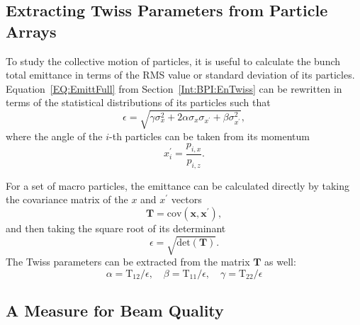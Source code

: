 \subsection{Extracting Twiss Parameters from Particle Arrays}
\label{Apx:SA:EnTwiss:Sim}

To study the collective motion of particles, it is useful to calculate the bunch total emittance in terms of the RMS value or standard deviation of its particles.
Equation~\ref{EQ:EmittFull} from Section~\ref{Int:BPI:EnTwiss} can be rewritten in terms of the statistical distributions of its particles such that
\begin{equation}
    \epsilon = \sqrt{\gamma\sigma_{x}^{2} + 2\alpha\sigma_{x}\sigma_{x^{\prime}} + \beta\sigma_{x^{\prime}}^{2}}, \label{EQ:Emitt}
\end{equation}
where the angle of the $i$-th particles can be taken from its momentum
\begin{equation}
    x_{i}^{\prime} = \frac{p_{i,x}}{p_{i,z}}.
\end{equation}

For a set of macro particles, the emittance can be calculated directly by taking the covariance matrix of the $x$ and $x^{\prime}$ vectors
\begin{equation}
    \mathbf{T} = \mathrm{cov}\left(\mathbf{x}, \mathbf{x}^{\prime}\right), \label{EQ:ECalc1}
\end{equation}
and then taking the square root of its determinant
\begin{equation}
    \epsilon = \sqrt{\mathrm{det}\left(\mathbf{T}\right)}. \label{EQ:ECalc2}
\end{equation}
The Twiss parameters can be extracted from the matrix $\mathbf{T}$ as well:
\begin{equation}
    \alpha = \mathrm{T}_{12}/\epsilon, \quad
    \beta  = \mathrm{T}_{11}/\epsilon, \quad
    \gamma = \mathrm{T}_{22}/\epsilon
\end{equation}

\subsection{A Measure for Beam Quality}
\label{Apx:SA:QTilde}

